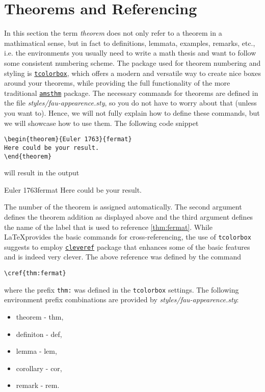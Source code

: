 \section{Theorems and Referencing}
In this section the term \textit{theorem} does not only refer to a theorem in a mathimatical 
sense, but in fact to definitions, lemmata, examples, remarks, etc., i.e. the environments 
you usually need to write a math thesis and want to follow some consistent numbering scheme. 
The package used for theorem numbering and styling is 
\href{https://www.ctan.org/pkg/tcolorbox}{\texttt{tcolorbox}}, which offers a modern and 
versatile way to create nice boxes around your theorems, while providing the full functionality 
of the more traditional \href{https://www.ctan.org/pkg/amsthm}{\texttt{amsthm}} package. 
The necessary commands for theorems are defined in the 
file \textit{styles/fau-appearence.sty}, so you do not have to worry about that (unless you want to). 
Hence, we will not fully explain how to define these commands, 
but we will showcase how to use them. The following code snippet
\begin{lstlisting}[language={[LaTeX]TeX}]
\begin{theorem}{Euler 1763}{fermat}
Here could be your result.
\end{theorem}
\end{lstlisting}
will result in the output
\begin{theorem}{Euler 1763}{fermat}
Here could be your result.
\end{theorem}
The number of the theorem is assigned automatically. The second argument defines the theorem 
addition as displayed above and the third argument defines the name of the label that is used 
to reference \cref{thm:fermat}. While \LaTeX provides the basic commands for cross-referencing, 
the use of \texttt{tcolorbox} suggests to employ 
\href{https://ctan.org/pkg/cleveref}{\texttt{cleveref}} package that enhances some 
of the basic features and is indeed very clever. The above reference was defined by the 
command
\begin{lstlisting}[language={[LaTeX]TeX}]
\cref{thm:fermat}
\end{lstlisting}
where the prefix \texttt{thm:} was defined in the \texttt{tcolorbox} settings. The following 
environment prefix combinations are provided by \textit{styles/fau-appearence.sty}: 
\begin{itemize}
\item theorem - thm,
\item definiton - def,
\item lemma - lem,
\item corollary - cor,
\item remark - rem.
\end{itemize}
